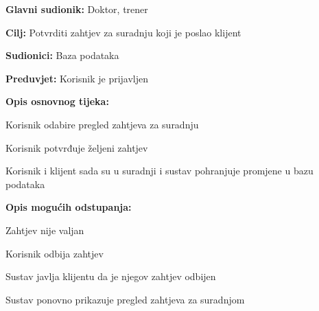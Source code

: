 					\noindent {}
					\begin{packed_item}
						
						\item \textbf{Glavni sudionik:} Doktor, trener
						\item  \textbf{Cilj:} Potvrditi zahtjev za suradnju koji je poslao klijent
						\item  \textbf{Sudionici:} Baza podataka
						\item  \textbf{Preduvjet:} Korisnik je prijavljen
						\item  \textbf{Opis osnovnog tijeka:}
						
						\item[] \begin{packed_enum}
							
							\item Korisnik odabire pregled zahtjeva za suradnju
							\item Korisnik potvrđuje željeni zahtjev
							\item Korisnik i klijent sada su u suradnji i sustav pohranjuje promjene u bazu podataka
							
						\end{packed_enum}
						
						\item  \textbf{Opis mogućih odstupanja:}
						
						\item[] \begin{packed_item}
							
							\item[2.a] Zahtjev nije valjan
							\item[] \begin{packed_enum}
								
								\item Korisnik odbija zahtjev
								\item Sustav javlja klijentu da je njegov zahtjev odbijen
								\item Sustav ponovno prikazuje pregled zahtjeva za suradnjom
								
							\end{packed_enum}
							
						\end{packed_item}	
						
					\end{packed_item}
				
